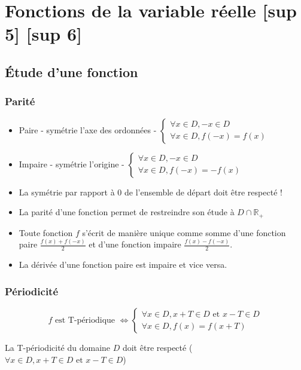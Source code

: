 \documentclass[openany]{book}
\begin{document}
\section{Fonctions de la variable réelle [sup 5] [sup 6]}

\subsection{Étude d'une fonction}
\subsubsection{Parité}
\begin{itemize}
    \item Paire - symétrie l'axe des ordonnées - $ \begin{cases} \forall x \in D, -x \in D \\ \forall x \in D, f(-x)=f(x) \end{cases} $
    \item Impaire - symétrie l'origine - $ \begin{cases} \forall x \in D, -x \in D \\ \forall x \in D, f(-x)=-f(x) \end{cases} $
    \item La symétrie par rapport à 0 de l'ensemble de départ doit être respecté !
    \item La parité d'une fonction permet de restreindre son étude à $D \cap \mathbb{R}_+$ 
    \item Toute fonction $f$ s'écrit de manière unique comme somme d'une fonction paire $ \frac{f(x) + f(-x)}{2} $ et d'une fonction impaire $ \frac{f(x)-f(-x)}{2} $.
    \item La dérivée d'une fonction paire est impaire et vice versa. 
\end{itemize}

\subsubsection{Périodicité}
\[ f \text{ est T-périodique } \iff \begin{cases} \forall x \in D, x+T \in D \text{ et } x-T \in D \\ \forall x \in D, f(x)=f(x+T) \end{cases} \]

La T-périodicité du domaine $D$ doit être respecté ($\forall x \in D, x+T \in D \text{ et } x-T \in D$)
\end{document}

